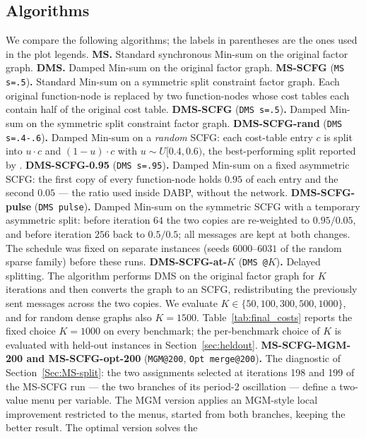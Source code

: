 \subsection{Algorithms}
We compare the following algorithms; the labels in parentheses are the ones
used in the plot legends.
\textbf{MS.}  Standard synchronous Min-sum on the original factor graph.
\textbf{DMS.}  Damped Min-sum on the original factor graph.
\textbf{MS-SCFG} (\texttt{MS s=.5})\textbf{.}  Standard Min-sum on a symmetric
split constraint factor graph.  Each original function-node is replaced by two
function-nodes whose cost tables each contain half of the original cost table.
\textbf{DMS-SCFG} (\texttt{DMS s=.5})\textbf{.}  Damped Min-sum on the
symmetric split constraint factor graph.
\textbf{DMS-SCFG-rand} (\texttt{DMS s=.4-.6})\textbf{.}  Damped Min-sum on a
\emph{random} SCFG: each cost-table entry $c$ is split into $u \cdot c$ and
$(1-u) \cdot c$ with $u \sim U[0.4, 0.6)$, the best-performing split reported
by \citet{CohenGZ20}.
\textbf{DMS-SCFG-0.95} (\texttt{DMS s=.95})\textbf{.}  Damped Min-sum on a
fixed asymmetric SCFG: the first copy of every function-node holds $0.95$
of each entry and the second $0.05$ --- the ratio used inside DABP, without
the network.
\textbf{DMS-SCFG-pulse} (\texttt{DMS pulse})\textbf{.}  Damped Min-sum on the
symmetric SCFG with a temporary asymmetric split: before iteration $64$ the
two copies are re-weighted to $0.95/0.05$, and before iteration $256$ back
to $0.5/0.5$; all messages are kept at both changes.  The schedule was fixed
on separate instances (seeds $6000$--$6031$ of the random sparse family) before
these runs.
\textbf{DMS-SCFG-at-$K$} (\texttt{DMS @$K$})\textbf{.}  Delayed splitting.  The
algorithm performs DMS on the original factor graph for $K$ iterations and then
converts the graph to an SCFG, redistributing the previously sent messages
across the two copies.  We evaluate $K\in\{50,100,300,500,1000\}$, and for
random dense graphs also $K=1500$.  Table~\ref{tab:final_costs} reports the
fixed choice $K=1000$ on every benchmark; the per-benchmark choice of $K$ is
evaluated with held-out instances in Section~\ref{sec:heldout}.
\textbf{MS-SCFG-MGM-200 and MS-SCFG-opt-200} (\texttt{MGM@200},
\texttt{Opt merge@200})\textbf{.}  The diagnostic of
Section~\ref{Sec:MS-split}: the two assignments selected at iterations 198
and 199 of the MS-SCFG run --- the two branches of its period-2 oscillation
--- define a two-value menu per variable.  The MGM version applies an
MGM-style local improvement restricted to the menus, started from both
branches, keeping the better result.  The optimal version solves the

